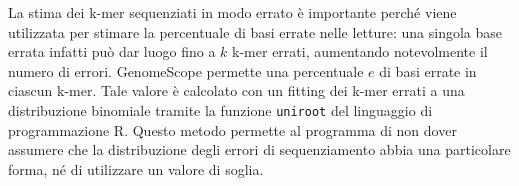 \documentclass[crop=false, class=book]{standalone}
\begin{document}
	La stima dei k-mer sequenziati in modo errato è importante perché viene utilizzata per stimare la percentuale di basi errate nelle letture: una singola base errata infatti può dar luogo fino a $k$ k-mer errati, aumentando notevolmente il numero di errori. GenomeScope permette una percentuale $e$ di basi errate in ciascun k-mer. Tale valore è calcolato con un fitting dei k-mer errati a una distribuzione binomiale tramite la funzione \verb|uniroot| del linguaggio di programmazione R. Questo metodo permette al programma di non dover assumere che la distribuzione degli errori di sequenziamento abbia una particolare forma, né di utilizzare un valore di soglia.
	
\end{document}
